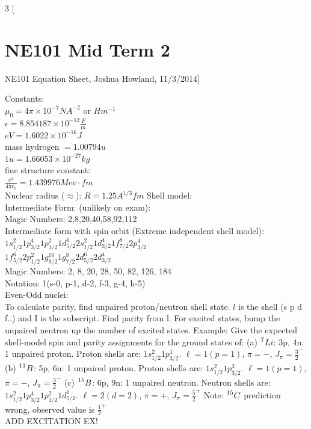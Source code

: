 \documentclass{article}
\begin{document}
\begin{multicols}{3}
[
\section{NE101 Mid Term 2}
NE101 Equation Sheet, Joshua Howland, 11/3/2014]

Constants:\\
$\mu_{0} = 4 \pi \times 10 ^{-7} NA^{-2}$ or $Hm^{-1} $\\
$\epsilon = 8.854187 \times 10 ^{-12} \frac{F}{m}$\\	
$eV = 1.6022\times 10 ^{-16} J$\\
mass hydrogen $ = 1.00794u  $\\
$1u = 1.66053 \times 10^{-27} kg $\\
fine structure constant: \\
$\frac{e^{2}}{4\pi\epsilon_{0}} = 1.439976 Mev \cdot fm$\\

Nuclear radius ($\approx$): $ R = 1.25A^{1/3} fm$
Shell model:\\
Intermediate Form: (unlikely on exam):\\
Magic Numbers: 2,8,20,40,58,92,112 \\

Intermediate form with spin orbit (Extreme independent shell model):\\
$1s_{1/2}^{2} 1p_{3/2}^{4} 1p_{1/2}^{2} 1d_{5/2}^{6} 2s_{1/2}^{2} 1d_{3/2}^{4} 1f_{7/2}^{8} 2p_{3/2}^{4} $\\
$1f_{5/2}^{6} 2p_{1/2}^{2} 1g_{9/2}^{10} 1g_{7/2}^{8} 2d_{5/2}^{6} 2d_{3/2}^{4}$\\
Magic Numbers: 2, 8, 20, 28, 50, 82, 126, 184\\
Notation: 1(s-0, p-1, d-2, f-3, g-4, h-5)\\

Even-Odd nuclei:\\
To calculate parity, find unpaired proton/neutron shell state.  $l$ is the shell (s p d f..) and I is the subscript.  Find parity from l.  For excited states, bump the unpaired neutron up the number of excited states.
\hspace*{0.01\textwidth} Example: Give the expected shell-model spin and parity assignments for the ground states of: (a) $ \prescript{7}{}{Li} $: 3p, 4n: 1 unpaired proton.  Proton shells are: $1s_{1/2}^{2}1p_{3/2}^{1}$.  $\ell = 1 (p=1)$, $\pi = -$, $J_{\pi} = \frac{3}{2}^{-}$ (b) $ \prescript{11}{}{B} $: 5p, 6n: 1 unpaired proton.  Proton shells are: $1s_{1/2}^{2}1p_{3/2}^{3}$.  $\ell = 1 (p=1)$, $\pi = -$, $J_{\pi} = \frac{3}{2}^{-}$ (c) $ \prescript{15}{}{B} $: 6p, 9n: 1 unpaired neutron.  Neutron shells are: $1s_{1/2}^{2}1p_{3/2}^{4}1p_{1/2}^{2}1d_{5/2}^{1}$.  $\ell = 2(d=2)$, $\pi = +$, $J_{\pi} = \frac{5}{2}^{+}$ Note: $\prescript{15}{}{C}$ prediction wrong, observed value is $\frac{1}{2}^{+}$\\
ADD EXCITATION EX!\\


\end{multicols}
\end{document}
